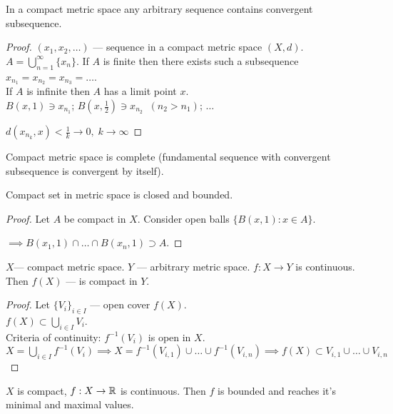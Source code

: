 \begin{corollary}
  In a compact metric space any arbitrary sequence contains convergent subsequence.
\end{corollary}

\begin{proof}
  $(x_1, x_2, \ldots)$ --- sequence in a compact metric space $(X,d)$.\\
  $A = \bigcup_{n=1}^{\infty} \{x_n\}$. If $A$ is finite then there exists such a subsequence $x_{n_1} = x_{n_2} = x_{n_3} = \ldots$.\\
  If $A$ is infinite then $A$ has a limit point $x$.\\
$B(x,1) \ni x_{n_1}$; $B(x,\frac{1}{2}) \ni x_{n_2} \;\; (n_2 > n_1)$; $\ldots$

$d(x_{n_k}, x) < \frac{1}{k} \to  0, \; k \to  \infty$
\end{proof}

\begin{corollary}
  Compact metric space is complete (fundamental sequence with convergent subsequence is convergent by itself).
\end{corollary}

\begin{corollary}
  Compact set in metric space is closed and bounded.
\end{corollary}

\begin{proof}
  Let $A$ be compact in $X$. Consider open balls $\{B(x,1): x \in  A\} $.

  $ \implies B(x_1,1) \cap \ldots \cap B(x_n, 1) \supset A$.
\end{proof}

\begin{theorem}
  $X$--- compact metric space. $Y$ --- arbitrary metric space. $f: X \to Y$ is continuous. Then $f(X)$ --- is compact in $Y$.
\end{theorem}

\begin{proof}
  Let $\{V_i\} _{i \in  I}$ --- open cover $f(X)$.\\
  $f(X) \subset \bigcup_{i \in I} V_i$.\\
  Criteria of continuity: $f^{-1}(V_i)$ is open in $X$.\\
  $X = \bigcup_{i \in I} f^{-1}(V_i) \implies X = f^{-1}(V_{i,1}) \cup \ldots \cup f^{-1}(V_{i,n}) \implies f(X) \subset V_{i,1} \cup \ldots \cup V_{i,n}$
\end{proof}

\begin{corollary}
  $X$ is compact, $f: X\to \mathbb{R}$ is continuous. Then $f$ is bounded and reaches it's minimal and maximal values.
\end{corollary}

